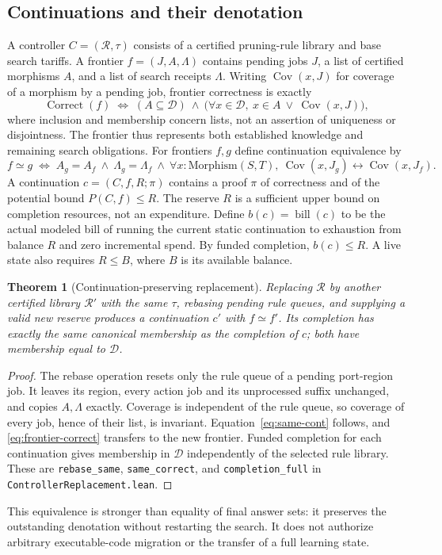 \documentclass[10pt,letterpaper]{article}
\newtheorem{theorem}{Theorem}[section]
\newcommand{\CanonRef}{\mathcal D}
\newcommand{\bill}{\operatorname{bill}}
\newcommand{\Cov}{\operatorname{Cov}}
\newcommand{\Correct}{\operatorname{Correct}}
\newcommand{\rc}[1]{\texttt{#1}}
\begin{document}
\subsection{Continuations and their denotation}
A controller $C=(\mathcal R,\tau)$ consists of a certified pruning-rule library and base search tariffs. A frontier $f=(J,A,\Lambda)$ contains pending jobs $J$, a list of certified morphisms $A$, and a list of search receipts $\Lambda$. Writing $\Cov(x,J)$ for coverage of a morphism by a pending job, frontier correctness is exactly
\begin{equation}\label{eq:frontier-correct}
 \Correct(f)\;\Longleftrightarrow\;
 (A\subseteq\CanonRef)\ \land\
 \bigl(\forall x\in\CanonRef,\ x\in A\ \lor\ \Cov(x,J)\bigr),
\end{equation}
where inclusion and membership concern lists, not an assertion of uniqueness or disjointness. The frontier thus represents both established knowledge and remaining search obligations. For frontiers $f,g$ define continuation equivalence by
\begin{equation}\label{eq:same-cont}
 f\simeq g\;\Longleftrightarrow\;
 A_g=A_f\ \land\ \Lambda_g=\Lambda_f\ \land\
 \forall x:\mathrm{Morphism}(S,T),\ \Cov(x,J_g)\leftrightarrow\Cov(x,J_f).
\end{equation}
A continuation $c=(C,f,R;\pi)$ contains a proof $\pi$ of correctness and of the potential bound $P(C,f)\le R$. The reserve $R$ is a sufficient upper bound on completion resources, not an expenditure. Define $b(c)=\bill(c)$ to be the actual modeled bill of running the current static continuation to exhaustion from balance $R$ and zero incremental spend. By funded completion, $b(c)\le R$. A live state also requires $R\le B$, where $B$ is its available balance.

\begin{theorem}[Continuation-preserving replacement]\label{thm:rebase}
Replacing $\mathcal R$ by another certified library $\mathcal R'$ with the same $\tau$, rebasing pending rule queues, and supplying a valid new reserve produces a continuation $c'$ with $f\simeq f'$. Its completion has exactly the same canonical membership as the completion of $c$; both have membership equal to $\CanonRef$.
\end{theorem}
\begin{proof}
The rebase operation resets only the rule queue of a pending port-region job. It leaves its region, every action job and its unprocessed suffix unchanged, and copies $A,\Lambda$ exactly. Coverage is independent of the rule queue, so coverage of every job, hence of their list, is invariant. Equation~\eqref{eq:same-cont} follows, and \eqref{eq:frontier-correct} transfers to the new frontier. Funded completion for each continuation gives membership in $\CanonRef$ independently of the selected rule library. These are \rc{rebase\_same}, \rc{same\_correct}, and \rc{completion\_full} in \rc{ControllerReplacement.lean}.
\end{proof}
This equivalence is stronger than equality of final answer sets: it preserves the outstanding denotation without restarting the search. It does not authorize arbitrary executable-code migration or the transfer of a full learning state.
\end{document}
